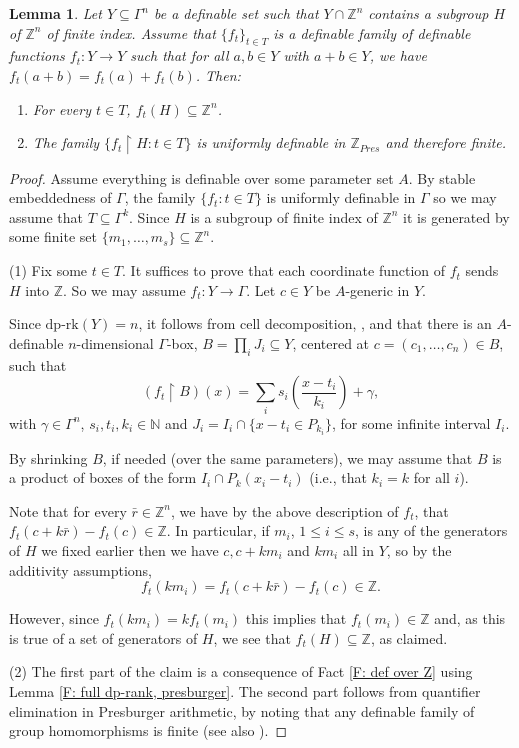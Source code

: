 \documentclass[11pt]{amsart}
\newtheorem{lemma}[theorem]{Lemma}
\theoremstyle{definition}
\newcommand{\Zz}{{\mathbb {Z}}}
\newcommand{\0}{\emptyset}
\def\dpr{\mathrm{dp\text{-}rk}}
\def\sub{\subseteq}
\begin{document}
\begin{lemma}\label{L: family of functions, presburger}
Let $Y\sub \Gamma^n$ be a definable set such that $Y\cap \Zz^n$ contains a subgroup $H$ of $\Zz^n$ of  finite index. Assume that $\{f_t\}_{t\in T}$ is a definable family of definable functions $f_t:Y \to Y$ such that for all $a,b\in Y$ with $a+b\in Y$,  we have $f_t(a+b)=f_t(a)+f_t(b)$. Then: 

\begin{enumerate}
    \item For every $t\in T$, $f_t(H)\subseteq \mathbb{Z}^n$.
    \item The family $\{f_t\restriction H:t\in T\}$ is uniformly definable in $\Zz_{Pres}$ and therefore finite.
\end{enumerate}
\end{lemma}
\begin{proof}
Assume everything is definable over some parameter set $A$. By stable embeddedness of $\Gamma$, the family $\{f_t: t\in T\}$ is uniformly definable in $\Gamma$ so we may assume that $T\sub \Gamma^k$. Since $H$ is a subgroup of finite index of $\mathbb{Z}^n$ it is generated by some finite set $\{m_1,\dots,m_s\}\sub \mathbb Z^n$.

(1) Fix some $t\in T$.  It suffices to prove that each  coordinate function of $f_t$ sends $H$ into $\mathbb{Z}$. So we may assume $f_t:Y\to \Gamma$.  Let $c\in Y$ be $A$-generic in $Y$.


Since $\dpr(Y)=n$, it follows from  cell decomposition,  \cite[Theorem 1]{ClucPresburger}, and  \cite[Lemma 3.4] {OnVi} that there is an $A$-definable $n$-dimensional  $\Gamma$-box, $B=\prod_i J_i\sub Y$, centered at $c=(c_1,\ldots, c_n)\in B$,  such that 
\[
(f_t\restriction B)(x)=\sum_i s_i\left( \frac{x-t_i}{k_i}\right) +\gamma,
\] 
with  $\gamma\in \Gamma^n$, $s_i,t_i,k_i\in \mathbb N$  and $J_i=I_i\cap \{x-t_i\in P_{k_i}\}$, for some infinite interval $I_i$.


By shrinking $B$, if needed (over the same parameters), we may assume that $B$ is a product of boxes of the form $I_i\cap P_k(x_i-t_i)$ (i.e., that $k_i=k$ for all $i$). 

Note that for every $\bar r\in\mathbb Z^n$, we have  by the above description of $f_t$, that 
$f_t(c+k\bar r)-f_t(c)\in \mathbb{Z}$.  In particular, if  $m_i$, $1\leq i\leq s$, is any of the generators of $H$ we fixed earlier then we have $c, c+km_i$ and $km_i$ all in $Y$, so by the additivity assumptions,  
$$f_t(km_i)=f_t(c+k\bar r)-f_t(c)\in \mathbb Z.$$

However, since $f_t(km_i)=kf_t(m_i)$ this implies that $f_t( m_i)\in \mathbb{Z}$ and, as this is true of a set of generators of $H$, we see that $f_t(H)\subseteq \mathbb{Z}$, as claimed.

(2) The first part of the claim  is a consequence of Fact \ref{F: def over Z} using Lemma \ref{F: full dp-rank, presburger}. The second part follows from quantifier elimination in Presburger arithmetic, by noting that  any definable family of group homomorphisms is finite (see also \cite[Fact 2.10]{OnVi}).
\end{proof}
\end{document}

